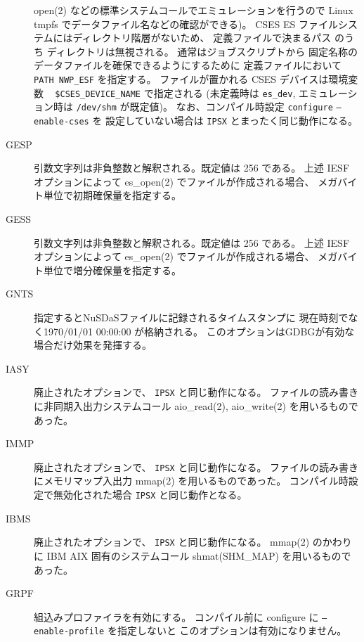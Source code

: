 \begin{description}
	open(2) などの標準システムコールでエミュレーションを行うので
	Linux tmpfs でデータファイル名などの確認ができる)。
	CSES ES ファイルシステムにはディレクトリ階層がないため、
	定義ファイルで決まるパス  のうち
	ディレクトリは無視される。
	通常はジョブスクリプトから
	固定名称のデータファイルを確保できるようにするために
	定義ファイルにおいて {\tt PATH NWP\_ESF} を指定する。
	ファイルが置かれる CSES デバイスは環境変数 ~ 
	{\tt \$CSES\_DEVICE\_NAME} で指定される
	(未定義時は {\tt es\_dev},
	エミュレーション時は {\tt /dev/shm} が既定値)。
	なお、コンパイル時設定 {\tt configure} {\tt --enable-cses} を
	設定していない場合は {\tt IPSX} とまったく同じ動作になる。
\item[GESP]
	引数文字列は非負整数と解釈される。既定値は 256 である。
	上述 IESF オプションによって es\_open(2) でファイルが作成される場合、
	メガバイト単位で初期確保量を指定する。
\item[GESS]
	引数文字列は非負整数と解釈される。既定値は 256 である。
	上述 IESF オプションによって es\_open(2) でファイルが作成される場合、
	メガバイト単位で増分確保量を指定する。
\item[GNTS]
        指定するとNuSDaSファイルに記録されるタイムスタンプに
        現在時刻でなく1970/01/01 00:00:00 が格納される。
	このオプションはGDBGが有効な場合だけ効果を発揮する。
\item[IASY]
	廃止されたオプションで、 {\tt IPSX} と同じ動作になる。
	ファイルの読み書きに非同期入出力システムコール
	aio\_read(2), aio\_write(2) を用いるものであった。
\item[IMMP]
	廃止されたオプションで、 {\tt IPSX} と同じ動作になる。
	ファイルの読み書きにメモリマップ入出力 mmap(2) を用いるものであった。
	コンパイル時設定で無効化された場合 {\tt IPSX} と同じ動作となる。
\item[IBMS]
	廃止されたオプションで、 {\tt IPSX} と同じ動作になる。
	mmap(2) のかわりに IBM AIX 固有のシステムコール shmat(SHM\_MAP)
	を用いるものであった。
\item[GRPF]
	組込みプロファイラを有効にする。
	コンパイル前に configure に {\tt --enable-profile} を指定しないと
	このオプションは有効になりません。
\end{description}
